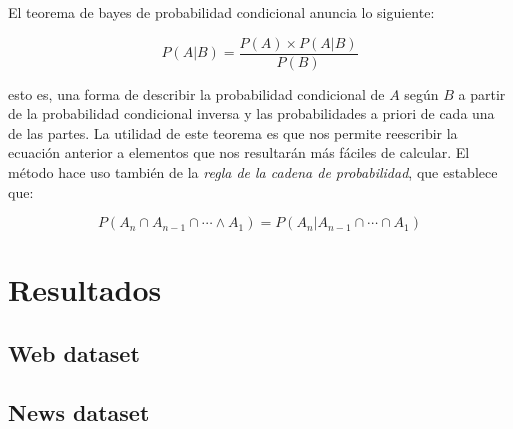 \documentclass[a4paper,10pt]{article}
\begin{document}
El teorema de bayes de probabilidad condicional anuncia lo siguiente:

$$ P(A | B) = \frac{P(A) \times P(A | B)}{P(B)} $$

esto es, una forma de describir la probabilidad condicional de $A$ según $B$ a partir de la probabilidad condicional inversa y las probabilidades a priori de cada una de las partes. La utilidad de este teorema es que nos permite reescribir la ecuación anterior a elementos que nos resultarán más fáciles de calcular. El método hace uso también de la \emph{regla de la cadena de probabilidad}, que establece que:

$$ P(A_n \cap A_{n-1} \cap \cdots \land A_1) = P(A_n | A_{n-1} \cap \cdots \cap A_1) $$

\section{Resultados}

\subsection{\textsf{Web} dataset}

\subsection{\textsf{News} dataset}
\end{document}
